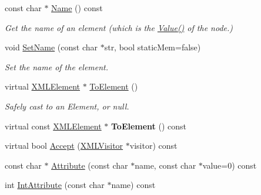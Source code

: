 \begin{DoxyCompactItemize}
\mbox{\label{classtinyxml2_1_1XMLElement_a63e057fb5baee1dd29f323cb85907b35}} 
const char $\ast$ \hyperlink{classtinyxml2_1_1XMLElement_a63e057fb5baee1dd29f323cb85907b35}{Name} () const
\begin{DoxyCompactList}\small\item\em Get the name of an element (which is the \hyperlink{classtinyxml2_1_1XMLNode_a66344989a4b436155bcda72bd6b07b82}{Value()} of the node.) \end{DoxyCompactList}\item 
\mbox{\label{classtinyxml2_1_1XMLElement_a97712009a530d8cb8a63bf705f02b4f1}} 
void \hyperlink{classtinyxml2_1_1XMLElement_a97712009a530d8cb8a63bf705f02b4f1}{Set\+Name} (const char $\ast$str, bool static\+Mem=false)
\begin{DoxyCompactList}\small\item\em Set the name of the element. \end{DoxyCompactList}\item 
\mbox{\label{classtinyxml2_1_1XMLElement_ad9ff5c2dbc15df36cf664ce1b0ea0a5d}} 
virtual \hyperlink{classtinyxml2_1_1XMLElement}{X\+M\+L\+Element} $\ast$ \hyperlink{classtinyxml2_1_1XMLElement_ad9ff5c2dbc15df36cf664ce1b0ea0a5d}{To\+Element} ()
\begin{DoxyCompactList}\small\item\em Safely cast to an Element, or null. \end{DoxyCompactList}\item 
\mbox{\label{classtinyxml2_1_1XMLElement_afeb353047ab8532191709dcaef07337e}} 
virtual const \hyperlink{classtinyxml2_1_1XMLElement}{X\+M\+L\+Element} $\ast$ {\bfseries To\+Element} () const
\item 
virtual bool \hyperlink{classtinyxml2_1_1XMLElement_a3ea8a40e788fb9ad876c28a32932c6d5}{Accept} (\hyperlink{classtinyxml2_1_1XMLVisitor}{X\+M\+L\+Visitor} $\ast$visitor) const
\item 
const char $\ast$ \hyperlink{classtinyxml2_1_1XMLElement_a70e49ed60b11212ae35f7e354cfe1de9}{Attribute} (const char $\ast$name, const char $\ast$value=0) const
\item 
int \hyperlink{classtinyxml2_1_1XMLElement_acfaaeeadf0b0dbe56bb0f5ec12cb7736}{Int\+Attribute} (const char $\ast$name) const

\end{DoxyCompactItemize}
